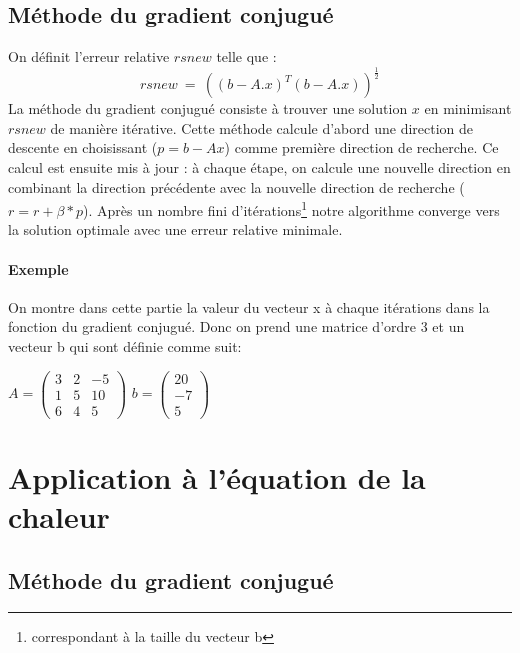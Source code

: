 \documentclass{article}
\begin{document}
\subsection{Méthode du gradient conjugué}

On définit l'erreur relative $rsnew$ telle que :
\begin{equation*}
  rsnew~=~((b-A.x)^{T}(b-A.x))^{\frac{1}{2}}
\end{equation*}
La méthode du gradient conjugué consiste à trouver une solution $x$ en minimisant
$rsnew$ de manière itérative. 
Cette méthode calcule d'abord une direction de descente en choisissant  ($p=b-Ax$) comme 
première direction de recherche. Ce calcul est ensuite mis à jour : à chaque étape, on calcule une nouvelle 
direction en combinant la direction précédente avec la nouvelle direction de 
recherche ($r=r+\beta*p$). Après un nombre fini d'itérations\footnote{correspondant à la taille du vecteur b}
notre algorithme converge vers la solution optimale avec une erreur relative minimale.


\paragraph{Exemple}
On montre dans cette partie la valeur du vecteur x à chaque itérations dans la fonction
du gradient conjugué. Donc on prend une matrice d'ordre 3 et un vecteur b qui sont définie comme suit:

$A=
\begin{pmatrix}
  3&2&-5 \\ 1&5&10 \\ 6&4&5
\end{pmatrix}
$
$b=
\begin{pmatrix}
  20 
  \\ -7 \\
    5
\end{pmatrix}
$


\section{Application à l'équation de la chaleur}
\subsection{Méthode du gradient conjugué}
\end{document}
